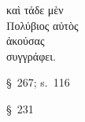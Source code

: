 
{\large
\begin{greek}
\noindent καὶ τάδε μὲν \\
Πολύβιος αὐτὸς \\
\tabto{2em} ἀκούσας \\
συγγράφει.\\

\end{greek}
}

\begin{description}[noitemsep]
\item[ἀκούσας] §~267; s.~116
\item[συγγράφει] §~231
\end{description}





